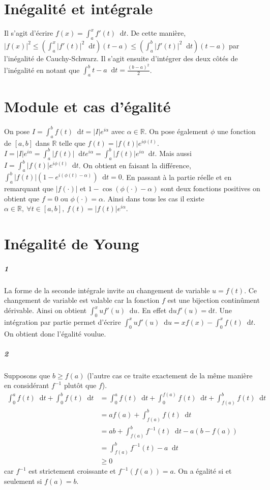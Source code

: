 \documentclass[10pt,a4paper]{article}
\newcommand{\al}[1]{\begin{aligned} #1 \end{aligned}}
\newcommand{\intt}[4]{\int_{#1}^{#2} #3 \mathop{}\!\mathrm{d} #4}
\begin{document}
\section{Inégalité et intégrale}
Il s'agit d'écrire $f(x) = \intt{a}{x}{f'(t)}{t}$. De cette manière, $\vert f(x) \vert^2 \le \left( \intt{a}{x}{\vert f'(t) \vert^2}{t} \right) (t-a) \le \left( \intt{a}{b}{\vert f'(t) \vert^2}{t} \right) (t-a)$ par l'inégalité de Cauchy-Schwarz. Il s'agit ensuite d'intégrer des deux côtés de l'inégalité en notant que $\intt{a}{b}{t-a}{t} = \frac{(b-a)^2}{2}$.
\section{Module et cas d'égalité}
On pose $I =\intt{a}{b}{f(t)}{t} = \vert I \vert e^{i\alpha}$ avec $\alpha \in \mathbb{R}$. On pose également $\phi$ une fonction de $[a,b]$ dans $\mathbb{R}$ telle que $f(t) = \vert f(t) \vert e^{i \phi(t)}$. $I = \vert I \vert e^{i\alpha} = \intt{a}{b}{\vert f(t) \vert}{t} e^{i \alpha} = \intt{a}{b}{\vert f(t) \vert e^{i\alpha}}{t}$. Mais aussi $I = \intt{a}{b}{\vert f(t) \vert e^{i \phi(t)}}{t}$. On obtient en faisant la différence, $\intt{a}{b}{\vert f(t) \vert (1 - e^{i (\phi(t) - \alpha)})}{t} = 0$. En passant à la partie réelle et en remarquant que $\vert f(\cdot) \vert$ et $1 - \cos \left( \phi(\cdot) - \alpha\right)$ sont deux fonctions positives on obtient que $f = 0$ ou $\phi(\cdot) = \alpha$. Ainsi dans tous les cas il existe $\alpha \in \mathbb{R}, \ \forall t \in [a,b], \ f(t) = \vert f(t) \vert e^{i\alpha}$.

\section{Inégalité de Young}
\subparagraph{1}La forme de la seconde intégrale invite au changement de variable $u=f(t)$. Ce changement de variable est valable car la fonction $f$ est une bijection continûment dérivable. Ainsi on obtient $\intt{0}{x}{uf'(u)}{u}$. En effet $\text{d}u f'(u) = \text{d}t$. Une intégration par partie permet d'écrire $\intt{0}{x}{uf'(u)}{u} = xf(x) - \intt{0}{x}{f(t)}{t}$. On obtient donc l'égalité voulue.
\subparagraph{2}Supposons que $b \ge f(a)$ (l'autre cas ce traite exactement de la même manière en considérant $f^{-1}$ plutôt que $f$). \[
\al{
\intt{0}{a}{f(t)}{t} + \intt{0}{b}{f(t)}{t} &= \intt{0}{a}{f(t)}{t} + \intt{0}{f(a)}{f(t)}{t} + \intt{f(a)}{b}{f(t)}{t}\\
&= af(a) + \intt{f(a)}{b}{f(t)}{t}\\
&= ab + \intt{f(a)}{b}{f^{-1}(t)}{t} -a(b-f(a))\\
&= \intt{f(a)}{b}{f^{-1}(t) - a}{t}\\
& \ge 0
}
\] car $f^{-1}$ est strictement croissante et $f^{-1}(f(a)) = a$. On a égalité si et seulement si $f(a) = b$.
\end{document}
